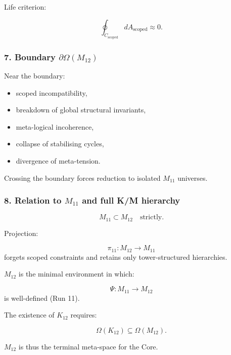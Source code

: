 Life criterion:

\[
\oint_{C_{\mathrm{scoped}}} dA_{\mathrm{scoped}} \approx 0.
\]

\subsubsection*{7. Boundary $\partial\Omega(M_{12})$}

Near the boundary:

\begin{itemize}
    \item scoped incompatibility,
    \item breakdown of global structural invariants,
    \item meta-logical incoherence,
    \item collapse of stabilising cycles,
    \item divergence of meta-tension.
\end{itemize}

Crossing the boundary forces reduction to isolated $M_{11}$ universes.

\subsubsection*{8. Relation to $M_{11}$ and full K/M hierarchy}

\[
M_{11} \subset M_{12}
\quad\text{strictly}.
\]

Projection:

\[
\pi_{11}: M_{12} \to M_{11}
\]
forgets scoped constraints and retains only tower-structured hierarchies.

$M_{12}$ is the minimal environment in which:

\[
\Psi: M_{11} \to M_{12}
\]
is well-defined (Run 11).

The existence of $K_{12}$ requires:

\[
\Omega(K_{12}) \subseteq \Omega(M_{12}).
\]

$M_{12}$ is thus the terminal meta-space for the Core.

